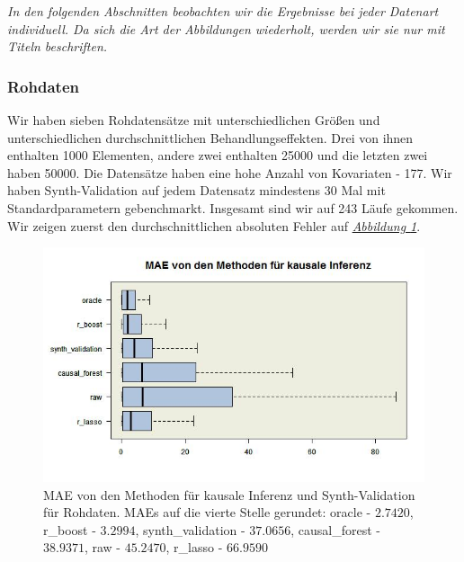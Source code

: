 \documentclass[12pt,a4paper,twoside]{scrartcl}
\numberwithin{equation}{section}
\newcommand{\reffig}[1]{\emph{\hyperref[#1]{Abbildung \ref*{#1}}}}
\begin{document}
\noindent
\emph{In den folgenden Abschnitten beobachten wir die Ergebnisse bei jeder Datenart individuell. Da sich die Art der Abbildungen wiederholt, werden wir sie nur mit Titeln beschriften.}\par

\subsubsection{Rohdaten}\label{subsubsec:ergebnisseRohdaten}

Wir haben sieben Rohdatensätze mit unterschiedlichen Größen und unterschiedlichen durchschnittlichen Behandlungseffekten. Drei von ihnen enthalten 1000 Elementen, andere zwei enthalten 25000 und die letzten zwei haben 50000. Die Datensätze haben eine hohe Anzahl von Kovariaten - 177. Wir haben Synth-Validation auf jedem Datensatz mindestens 30 Mal mit Standardparametern gebenchmarkt. Insgesamt sind wir auf 243 Läufe gekommen. Wir zeigen zuerst den durchschnittlichen absoluten Fehler auf \reffig{fig:rawDataBoxplot}.\par 

\begin{center}
\begin{figure}[h]
    \centering
    \includegraphics[height=0.5\textwidth, width=1\textwidth]{figures/plots/rawDataBoxplot.jpeg}
    \caption[MAE von den Methoden für kausale Inferenz und Synth-Validation für Rohdaten]{MAE von den Methoden für kausale Inferenz und Synth-Validation für Rohdaten. MAEs auf die vierte Stelle gerundet: oracle - $2.7420$, r\_boost - $3.2994$, synth\_validation - $37.0656$, causal\_forest - $38.9371$, raw - $45.2470$, r\_lasso - $66.9590$}\label{fig:rawDataBoxplot}
  \end{figure}
\end{center}
   
\end{document}

